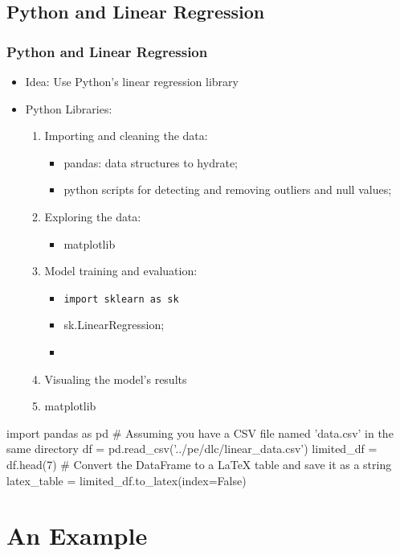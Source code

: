\documentclass{beamer}
\newcounter{slidenum}
\begin{document}
\begin{frame}
\section{Python and Linear Regression}
\frametitle{Python and Linear Regression}
\begin{itemize}
\item Idea: Use Python's linear regression library
\item Python Libraries:
	\begin{enumerate}
		\item [] Importing and cleaning the data:
			\begin{itemize}
				\item pandas: data structures to hydrate;

				\item python scripts for detecting and removing
					outliers and null values;
			\end{itemize}
		\item [] Exploring the data:
			\begin{itemize}
				\item matplotlib 
			\end{itemize}
		\item [] Model training and evaluation: 
			\begin{itemize}
		\item \lstinline{import sklearn as sk}
				\item sk.LinearRegression;
				\item 
			\end{itemize}
		\item [] Visualing the model's results
		\item matplotlib
	\end{enumerate}
\end{itemize}
\end{frame}

\begin{pycode}
import pandas as pd
# Assuming you have a CSV file named 'data.csv' in the same directory
df = pd.read_csv('../pe/dlc/linear_data.csv')
limited_df = df.head(7)
# Convert the DataFrame to a LaTeX table and save it as a string
latex_table = limited_df.to_latex(index=False)
\end{pycode}

\section{An Example}
\end{document}
